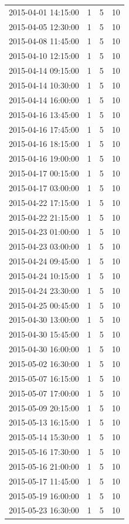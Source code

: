 \begin{tabular}{lrrr}
2015-04-01 14:15:00 & 1 & 5 & 10 \\
2015-04-05 12:30:00 & 1 & 5 & 10 \\
2015-04-08 11:45:00 & 1 & 5 & 10 \\
2015-04-10 12:15:00 & 1 & 5 & 10 \\
2015-04-14 09:15:00 & 1 & 5 & 10 \\
2015-04-14 10:30:00 & 1 & 5 & 10 \\
2015-04-14 16:00:00 & 1 & 5 & 10 \\
2015-04-16 13:45:00 & 1 & 5 & 10 \\
2015-04-16 17:45:00 & 1 & 5 & 10 \\
2015-04-16 18:15:00 & 1 & 5 & 10 \\
2015-04-16 19:00:00 & 1 & 5 & 10 \\
2015-04-17 00:15:00 & 1 & 5 & 10 \\
2015-04-17 03:00:00 & 1 & 5 & 10 \\
2015-04-22 17:15:00 & 1 & 5 & 10 \\
2015-04-22 21:15:00 & 1 & 5 & 10 \\
2015-04-23 01:00:00 & 1 & 5 & 10 \\
2015-04-23 03:00:00 & 1 & 5 & 10 \\
2015-04-24 09:45:00 & 1 & 5 & 10 \\
2015-04-24 10:15:00 & 1 & 5 & 10 \\
2015-04-24 23:30:00 & 1 & 5 & 10 \\
2015-04-25 00:45:00 & 1 & 5 & 10 \\
2015-04-30 13:00:00 & 1 & 5 & 10 \\
2015-04-30 15:45:00 & 1 & 5 & 10 \\
2015-04-30 16:00:00 & 1 & 5 & 10 \\
2015-05-02 16:30:00 & 1 & 5 & 10 \\
2015-05-07 16:15:00 & 1 & 5 & 10 \\
2015-05-07 17:00:00 & 1 & 5 & 10 \\
2015-05-09 20:15:00 & 1 & 5 & 10 \\
2015-05-13 16:15:00 & 1 & 5 & 10 \\
2015-05-14 15:30:00 & 1 & 5 & 10 \\
2015-05-16 17:30:00 & 1 & 5 & 10 \\
2015-05-16 21:00:00 & 1 & 5 & 10 \\
2015-05-17 11:45:00 & 1 & 5 & 10 \\
2015-05-19 16:00:00 & 1 & 5 & 10 \\
2015-05-23 16:30:00 & 1 & 5 & 10 \\

\end{tabular}
